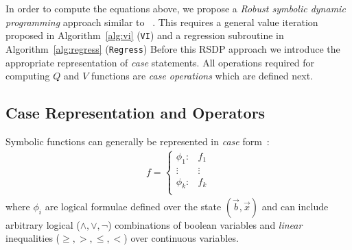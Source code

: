 
In order to compute the equations above, we propose a \emph{Robust symbolic dynamic programming} approach similar to ~\cite{sanner_uai11}.  This requires a general value iteration proposed in Algorithm~\ref{alg:vi} (\texttt{VI})
and a regression subroutine in Algorithm~\ref{alg:regress}
(\texttt{Regress}) %
Before this RSDP approach we introduce the appropriate representation of \emph{case} statements. All operations required for computing $Q$ and $V$ functions are \emph{case operations} which are defined next. 

\subsection{Case Representation and Operators}

Symbolic functions can generally be represented in \emph{case} form~\cite{fomdp}:
{%
\begin{align}
f = 
\begin{cases}
  \phi_1: & f_1 \\ 
 \vdots&\vdots\\ 
  \phi_k: & f_k \\ 
\end{cases} \label{eq:case}
\end{align}
}
where $\phi_i$ are logical formulae defined over the state
$(\vec{b},\vec{x})$ and can include arbitrary logical ($\land,\lor,\neg$)
combinations of boolean variables and \emph{linear} inequalities ($\geq,>,\leq,<$) 
over continuous variables.  


